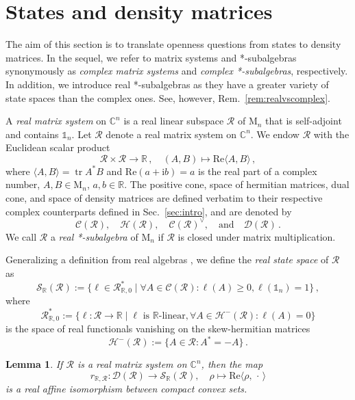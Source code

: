\documentclass[a4paper,11pt,reqno]{amsart}
\newcommand{\C}{\mathbb{C}}
\newcommand{\R}{\mathbb{R}}
\newcommand{\M}{\mathrm{M}}
\newcommand{\cC}{\mathcal{C}}
\newcommand{\cD}{\mathcal{D}}
\newcommand{\cH}{\mathcal{H}}
\newcommand{\cR}{\mathcal{R}}
\newcommand{\cS}{\mathcal{S}}
\newcommand{\ii}{\mathrm{i}}
\newcommand{\id}{\mathds{1}}
\renewcommand\Re{\mathrm{Re}}
\DeclareMathOperator\tr{tr}
\newtheorem{lem}[thm]{Lemma}
\theoremstyle{definition}
\theoremstyle{remark}
\numberwithin{equation}{section}
\begin{document}
\section{States and density matrices}
\label{sec:states}
%
The aim of this section is to translate openness questions from states to 
density matrices. 
In the sequel, we refer to matrix systems and *-subalgebras synonymously as 
\emph{complex matrix systems} and \emph{complex *-subalgebras}, respectively.
In addition, we introduce real *-subalgebras as they have a greater variety 
of state spaces than the complex ones. See, however, 
Rem.~\ref{rem:realvscomplex}.
\par
%
A \emph{real matrix system} on $\C^n$ is a real linear subspace $\cR$ of $\M_n$ 
that is self-adjoint and contains $\id_n$. Let $\cR$ denote a real matrix 
system on $\C^n$. We endow $\cR$ with the Euclidean scalar product 
\begin{equation}\label{eq:scalarp}
\cR\times\cR\to\R\,,
\quad
(A,B)\mapsto\Re\langle A,B\rangle\,,
\end{equation} 
where $\langle A,B\rangle=\tr A^\ast B$ and $\Re(a+\ii b)=a$ is the real part of 
a complex number, $A,B\in\M_n$, $a,b\in\R$. The positive cone, space of hermitian 
matrices, dual cone, and space of density matrices are defined verbatim to their 
respective complex counterparts defined in Sec.~\ref{sec:intro}, and are denoted 
by 
\[
\cC(\cR),
\quad 
\cH(\cR),
\quad 
\cC(\cR)^\vee,
\quad\text{and}\quad 
\cD(\cR)\,.
\]
We call $\cR$ a \emph{real *-subalgebra} of $\M_n$ if $\cR$ is closed under 
matrix multiplication. 
\par
%
Generalizing a definition from real algebras \cite[Sec.~4.5]{Li2003}, 
we define the \emph{real state space} of $\cR$ as
\[
\cS_\R(\cR):=\{\ell\in\cR_{\R,0}^\ast\mid 
\forall A\in\cC(\cR):\ell(A)\geq 0, \ell(\id_n)=1\}\,,
\]
where
\[
\cR_{\R,0}^\ast:=
\{\ell:\cR\to\R \mid \mbox{$\ell$ is $\R$-linear},
\forall A\in\cH^-(\cR):\ell(A)=0\}
\]
is the space of real functionals vanishing on the skew-hermitian 
matrices
\[
\cH^-(\cR):=\{A\in\cR:A^\ast=-A\}\,.
\]
\par
%
\begin{lem}\label{lem:riesz-real}
If $\cR$ is a real matrix system on $\C^n$, then the map
\[
r_{\R,\cR}:\cD(\cR)\to\cS_\R(\cR), 
\quad 
\rho\mapsto\Re\langle\rho,\,\cdot\,\rangle
\]
is a real affine isomorphism between compact convex sets.
\end{lem}
%
\end{document}
